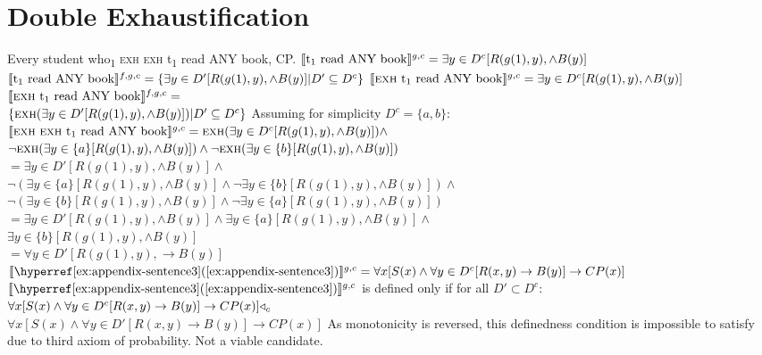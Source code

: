 \section{Double Exhaustification}
\pex[nopreamble=true]%
\a{} Every student who\textsubscript{1} {\scshape exh} {\scshape exh} t\textsubscript{1} read \MakeUppercase{any} book, CP.
\a{} $\intension[g,c]{t\textsubscript{1} read ANY book}=\exists{y\in D^c}[R(g(1),y),\land B(y)]$
\a{} $\intension[f,g,c]{t\textsubscript{1} read ANY book}=\{\exists{y\in D'}[R(g(1),y),\land B(y)]|D'\subseteq D^c\}$
\a{} $\intension[g,c]{{\scshape exh} t\textsubscript{1} read ANY book}=\exists{y\in D^c}[R(g(1),y),\land B(y)]$
\a{} $\intension[f,g,c]{{\scshape exh} t\textsubscript{1} read ANY book}=$\\\emptyfill$\{\predicate{exh}(\exists{y\in D'}[R(g(1),y),\land B(y)])|D'\subseteq D^c\}$
\a{} Assuming for simplicity $D^c=\{a,b\}$:\\$\intension[g,c]{{\scshape exh} {\scshape exh} t\textsubscript{1} read ANY book}=\predicate{exh}(\exists{y\in D^c}[R(g(1),y),\land B(y)])\land$\\$\neg\predicate{exh}(\exists{y\in \{a\}}[R(g(1),y),\land B(y)])\land\neg\predicate{exh}(\exists{y\in \{b\}}[R(g(1),y),\land B(y)])$\\
$=\exists{y\in D'}[R(g(1),y),\land B(y)]\land$\\\emptyfill$\neg(\exists{y\in\{a\}}[R(g(1),y),\land B(y)]\land\neg\exists{y\in\{b\}}[R(g(1),y),\land B(y)])\land$\\\emptyfill$\neg(\exists{y\in\{b\}}[R(g(1),y),\land B(y)]\land\neg\exists{y\in\{a\}}[R(g(1),y),\land B(y)])\phantom{\land}$\\
$=\exists{y\in D'}[R(g(1),y),\land B(y)]\land\exists{y\in\{a\}}[R(g(1),y),\land B(y)]\land$\\\emptyfill$\exists{y\in\{b\}}[R(g(1),y),\land B(y)]$\\
$=\forall{y\in D'}[R(g(1),y),\rightarrow B(y)]$
\a{} $\intension[g,c]{\refex{appendix-sentence3}}=\forall{x}[S(x)\land\forall{y\in D^c}[R(x,y)\rightarrow B(y)]\rightarrow CP(x)]$
\a{} $\intension[g,c]{\refex{appendix-sentence3}}$ is defined only if for all $D'\subset D^c$:\\$\forall{x}[S(x)\land\forall{y\in D^c}[R(x,y)\rightarrow B(y)]\rightarrow CP(x)]\lprob_c$\\\emptyfill$\forall{x}[S(x)\land\forall{y\in D'}[R(x,y)\rightarrow B(y)]\rightarrow CP(x)]$
\xe
As monotonicity is reversed, this definedness condition is impossible to satisfy due to  third axiom of probability. Not a viable candidate.

